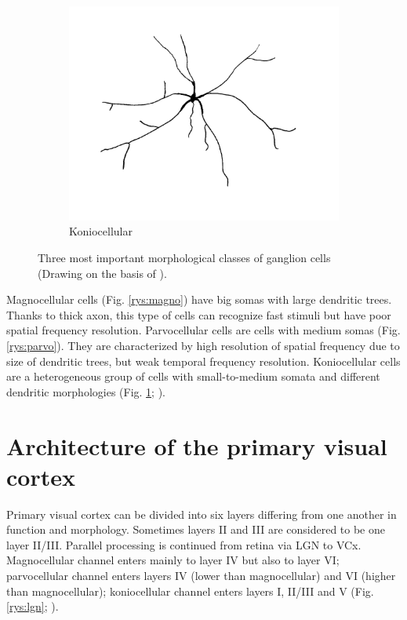 \documentclass{pracalicmgr}
\begin{document}
\begin{figure}[H]
\begin{subfigure}{.33\textwidth}
   		\centering
   		\includegraphics[width=1\linewidth]{cell_K2.png}
   		\caption{Koniocellular}
   		\label{rys:konio}
   	\end{subfigure}
   	\caption{Three most important morphological classes of ganglion cells  (Drawing on the basis of \cite{parallel}).}
   	\label{rys:ganglio}
   \end{figure}
   Magnocellular cells (Fig. \ref{rys:magno}) have big somas with large dendritic trees. Thanks to thick axon, this type of cells can recognize fast stimuli but have poor spatial frequency resolution. Parvocellular cells are cells with medium somas (Fig. \ref{rys:parvo}). They are characterized by high resolution of spatial frequency due to size of dendritic trees, but weak temporal frequency resolution. Koniocellular cells are a heterogeneous group of cells with small-to-medium somata and different dendritic morphologies (Fig. \ref{rys:konio}; \cite{parallel, viola}). 
   
   
   \section{Architecture of the primary visual cortex}
   Primary visual cortex can be divided into six layers differing from one another in function and morphology. Sometimes layers II and III are considered to be one layer II/III. Parallel processing is continued from retina via LGN to VCx. Magnocellular channel enters mainly to layer IV but also to layer VI; parvocellular channel enters layers IV (lower than magnocellular) and VI (higher than magnocellular); koniocellular channel enters layers I, II/III and V (Fig. \ref{rys:lgn}; \cite{parallel}).
   
\end{document}
